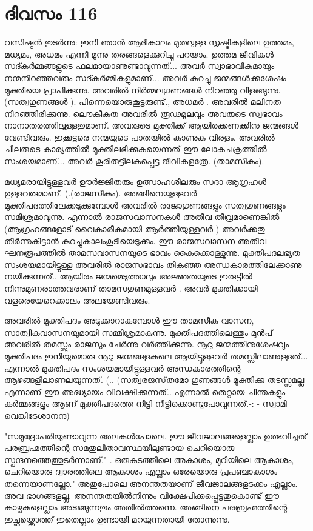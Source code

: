 \newpage
\section{ദിവസം 116}


വസിഷ്ഠന്‍ തുടര്‍ന്നു: ഇനി ഞാന്‍ ആദികാലം മുതലുള്ള സൃഷ്ടികളിലെ ഉത്തമം, മധ്യമം, അധമം എന്നീ  മൂന്നു തരങ്ങളെക്കുറിച്ചു പറയാം. ഉത്തമ ജീവികള്‍ സദ്കര്‍മ്മങ്ങളുടെ ഫലമായാണുണ്ടാവുന്നത്‌... അവര്‍ സ്വാഭാവികമായും നന്മനിറഞ്ഞവരും സദ്കര്‍മ്മികളുമാണ്‌... അവര്‍ കുറച്ചു ജന്മങ്ങള്‍ക്കുശേഷം മുക്തിയെ പ്രാപിക്കുന്നു. അവരില്‍ നിര്‍മ്മലഗുണങ്ങള്‍ നിറഞ്ഞു വിളങ്ങുന്നു. (സത്വഗുണങ്ങള്‍ ).  പിന്നെയൊരുകൂട്ടരുണ്ട്‌., അധമര്‍ . അവരില്‍ മലിനത നിറഞ്ഞിരിക്കുന്നു. ലൌകീകത അവരില്‍ രൂഢമൂലവും അവരുടെ സ്വഭാവം നാനാതരത്തിലുള്ളതുമാണ്. അവരുടെ മുക്തിക്ക്‌ ആയിരക്കണക്കിനു ജന്മങ്ങള്‍ വേണ്ടിവരും. ഇക്കൂട്ടരെ നന്മയുടെ പാതയില്‍ കാണുക വിരളം. അവരില്‍ ചിലരുടെ കാര്യത്തില്‍ മുക്തിലഭിക്കുകയെന്നത്‌ ഈ ലോകചക്രത്തില്‍ സംശയമാണ്‌... അവര്‍ കൂരിരുട്ടിലകപ്പെട്ട ജീവികളത്രേ. (താമസീകം).

മധ്യമരായിട്ടുള്ളവര്‍ ഊര്‍ജ്ജിതരും ഉത്സാഹശീലരും സദാ ആഗ്രഹള്‍   ഉള്ളവരുമാണ്‌. (.(രാജസീകം). അങ്ങിനെയുള്ളവര്‍ മുക്തിപദത്തിലേക്കടുക്കുമ്പോള്‍ അവരില്‍ രജോഗുണങ്ങളും സത്വഗുണങ്ങളും സമിശ്രമാവുന്നു. എന്നാല്‍ രാജസവാസനകള്‍ അതീവ തീവ്രമാണെങ്കില്‍ (ആഗ്രഹങ്ങളോട്‌ വൈകാരീകമായി ആര്‍ത്തിയുള്ളവര്‍ ) അവര്‍ക്കതു തീര്‍ന്നുകിട്ടാന്‍ കുറച്ചുകാലംകൂടിയെടുക്കും.  ഈ രാജസവാസന അതീവ ഘനരൂപത്തില്‍ താമസവാസനയുടെ ഭാവം കൈക്കൊള്ളുന്നു. മുക്തിപദലഭ്യത സംശയമായിട്ടുള്ള അവരില്‍ രാജസഭാവം തികഞ്ഞ അന്ധകാരത്തിലേക്കാണു നയിക്കുന്നത്‌.. ആയിരം ജന്മമെടുത്താലും അജ്ഞതയുടെ ഇരുട്ടില്‍ നിന്നുമുണരാത്തവരാണ്‌ താമസഗുണമുള്ളവര്‍ .  അവര്‍ മുക്തിക്കായി വളരെയേറെക്കാലം അലയേണ്ടിവരും.

അവരില്‍ മുക്തിപദം അടുക്കാറാകുമ്പോള്‍ ഈ താമസീക വാസന, സാത്വീകവാസനയുമായി സമ്മിശ്രമാകുന്നു. മുക്തിപദത്തിലെത്തും മുന്‍പ്‌ അവരില്‍ തമസ്സും രാജസും ചേര്‍ന്നു വര്‍ത്തിക്കുന്നു. നൂറു ജന്മത്തിനുശേഷവും മുക്തിപദം ഇനിയുമൊരു നൂറു ജന്മങ്ങളകലെ ആയിട്ടുള്ളവര്‍ തമസ്സിലാണുള്ളത്‌... എന്നാല്‍ മുക്തിപദം സംശയമായിട്ടുള്ളവര്‍ അന്ധകാരത്തിന്റെ ആഴങ്ങളിലാണലയുന്നത്‌. (.. (സത്വരജസ്‌തമോ ഗുണങ്ങള്‍ മുക്തിക്കു തടസ്സമല്ല എന്നാണ്‌ ഈ അദ്ധ്യായം വിവക്ഷിക്കുന്നത്‌.. എന്നാല്‍ തെറ്റായ ചിന്തകളും കര്‍മ്മങ്ങളും ആണ്‌ മുക്തിപദത്തെ നീട്ടി നീട്ടിക്കൊണ്ടുപോവുന്നത്‌.-: - സ്വാമി വെങ്കിടേശാനന്ദ)

"സമുദ്രോപരിയുണ്ടാവുന്ന അലകള്‍പോലെ, ഈ ജീവജാലങ്ങളെല്ലാം ഉത്ഭവിച്ചത്‌ പരബ്രഹ്മത്തിന്റെ സമതുലിതാവസ്ഥയിലുണ്ടായ ചെറിയൊരു സ്പന്ദനത്തെത്തുടര്‍ന്നാണ്‌." . ഒരുകുടത്തിലെ അകാശം, മുറിയിലെ ആകാശം, ചെറിയൊരു ദ്വാരത്തിലെ ആകാശം എല്ലാം ഒരേയൊരു പ്രപഞ്ചാകാശം തന്നെയാണല്ലോ." അതുപോലെ അനന്തതയാണ്‌ ജീവജാലങ്ങളടക്കം എല്ലാം. അവ ഭാഗങ്ങളല്ല. അനന്തതയില്‍നിന്നും വിക്ഷേപിക്കപ്പെട്ടതുകൊണ്ട്‌ ഈ കാഴ്ചകളെല്ലാം അടങ്ങുന്നതും അതില്‍ത്തന്നെ. അങ്ങിനെ പരബ്രഹ്മത്തിന്റെ ഇച്ഛയ്ക്കൊത്ത്‌ ഇതെല്ലാം ഉണ്ടായി മറയുന്നതായി തോന്നുന്നു. 

